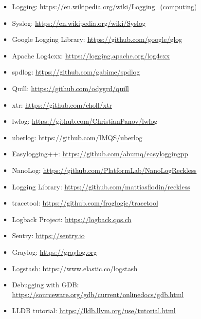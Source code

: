 
\begin{itemize}
\item
Logging: \url{https://en.wikipedia.org/wiki/Logging_(computing)}

\item
Syslog: \url{https://en.wikipedia.org/wiki/Syslog}

\item
Google Logging Library: \url{https://github.com/google/glog}

\item
Apache Log4cxx: \url{https://logging.apache.org/log4cxx}

\item
spdlog: \url{https://github.com/gabime/spdlog}

\item
Quill: \url{https://github.com/odygrd/quill}

\item
xtr: \url{https://github.com/choll/xtr}

\item
lwlog: \url{https://github.com/ChristianPanov/lwlog}

\item
uberlog: \url{https://github.com/IMQS/uberlog}

\item
Easylogging++: \url{https://github.com/abumq/easyloggingpp}

\item
NanoLog: \url{https://github.com/PlatformLab/NanoLogReckless}

\item
Logging Library: \url{https://github.com/mattiasflodin/reckless}

\item
tracetool: \url{https://github.com/froglogic/tracetool}

\item
Logback Project: \url{https://logback.qos.ch}

\item
Sentry: \url{https://sentry.io}

\item
Graylog: \url{https://graylog.org}

\item
Logstash: \url{https://www.elastic.co/logstash}

\item
Debugging with GDB: \url{https://sourceware.org/gdb/current/onlinedocs/gdb.html}

\item
LLDB tutorial: \url{https://lldb.llvm.org/use/tutorial.html}


\end{itemize}
